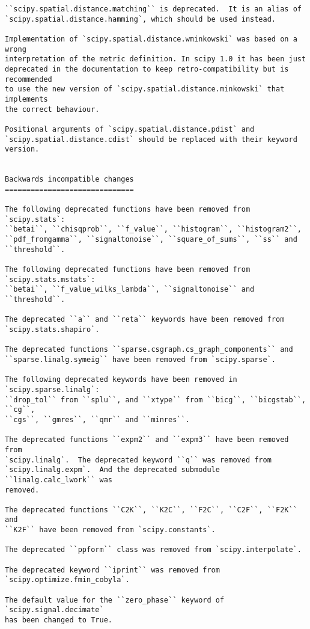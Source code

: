 \begin{verbatim}
``scipy.spatial.distance.matching`` is deprecated.  It is an alias of
`scipy.spatial.distance.hamming`, which should be used instead.

Implementation of `scipy.spatial.distance.wminkowski` was based on a wrong
interpretation of the metric definition. In scipy 1.0 it has been just
deprecated in the documentation to keep retro-compatibility but is
recommended
to use the new version of `scipy.spatial.distance.minkowski` that implements
the correct behaviour.

Positional arguments of `scipy.spatial.distance.pdist` and
`scipy.spatial.distance.cdist` should be replaced with their keyword
version.


Backwards incompatible changes
==============================

The following deprecated functions have been removed from `scipy.stats`:
``betai``, ``chisqprob``, ``f_value``, ``histogram``, ``histogram2``,
``pdf_fromgamma``, ``signaltonoise``, ``square_of_sums``, ``ss`` and
``threshold``.

The following deprecated functions have been removed from
`scipy.stats.mstats`:
``betai``, ``f_value_wilks_lambda``, ``signaltonoise`` and ``threshold``.

The deprecated ``a`` and ``reta`` keywords have been removed from
`scipy.stats.shapiro`.

The deprecated functions ``sparse.csgraph.cs_graph_components`` and
``sparse.linalg.symeig`` have been removed from `scipy.sparse`.

The following deprecated keywords have been removed in
`scipy.sparse.linalg`:
``drop_tol`` from ``splu``, and ``xtype`` from ``bicg``, ``bicgstab``,
``cg``,
``cgs``, ``gmres``, ``qmr`` and ``minres``.

The deprecated functions ``expm2`` and ``expm3`` have been removed from
`scipy.linalg`.  The deprecated keyword ``q`` was removed from
`scipy.linalg.expm`.  And the deprecated submodule ``linalg.calc_lwork`` was
removed.

The deprecated functions ``C2K``, ``K2C``, ``F2C``, ``C2F``, ``F2K`` and
``K2F`` have been removed from `scipy.constants`.

The deprecated ``ppform`` class was removed from `scipy.interpolate`.

The deprecated keyword ``iprint`` was removed from
`scipy.optimize.fmin_cobyla`.

The default value for the ``zero_phase`` keyword of `scipy.signal.decimate`
has been changed to True.


\end{verbatim}
